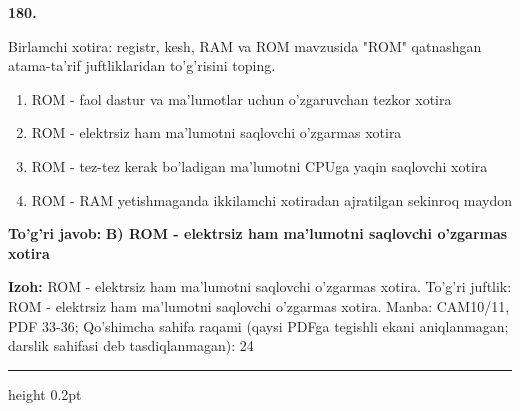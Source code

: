 \documentclass[10pt,a4paper]{article}
\begin{document}
{\bfseries\sffamily\color{ink} 180.}
\par
Birlamchi xotira: registr, kesh, RAM va ROM mavzusida "ROM" qatnashgan atama-ta'rif juftliklaridan to'g'risini toping.
\begin{enumerate}[label=\Alph*),leftmargin=9mm]
\item ROM - faol dastur va ma'lumotlar uchun o'zgaruvchan tezkor xotira
\item ROM - elektrsiz ham ma'lumotni saqlovchi o'zgarmas xotira
\item ROM - tez-tez kerak bo'ladigan ma'lumotni CPUga yaqin saqlovchi xotira
\item ROM - RAM yetishmaganda ikkilamchi xotiradan ajratilgan sekinroq maydon
\end{enumerate}
\begin{tcolorbox}[enhanced,breakable,colback=teal!4,colframe=teal!60!black,boxrule=0.45pt,arc=1.2mm,left=2.7mm,right=2.7mm,top=1.8mm,bottom=1.8mm,before skip=2mm,after skip=2mm]
{\bfseries\sffamily\color{teal}To'g'ri javob:} \textbf{B) ROM - elektrsiz ham ma'lumotni saqlovchi o'zgarmas xotira}
\par\smallskip
{\bfseries Izoh:} ROM - elektrsiz ham ma'lumotni saqlovchi o'zgarmas xotira. To'g'ri juftlik: ROM - elektrsiz ham ma'lumotni saqlovchi o'zgarmas xotira. Manba: CAM10/11, PDF 33-36; Qo'shimcha sahifa raqami (qaysi PDFga tegishli ekani aniqlanmagan; darslik sahifasi deb tasdiqlanmagan): 24
\end{tcolorbox}
\vspace{2mm}\hrule height 0.2pt\vspace{3mm}
\end{document}
